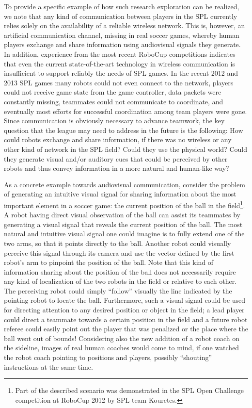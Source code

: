 \documentclass{llncs}
\begin{document}
To provide a specific example of how such research exploration can be realized, we note that 
any kind of communication between players in the SPL currently relies solely on the 
availability of a reliable wireless network. This is, however, an artificial communication 
channel, missing in real soccer games, whereby human players exchange and share information 
using audiovisual signals they generate. 
In addition, experience from the most recent RoboCup competitions indicates that even the 
current state-of-the-art technology in wireless communication is insufficient to support 
reliably the needs of SPL games. In the recent 2012 and 2013 SPL games many robots could not 
even connect to the network, players could not receive game state from the game controller, 
data packets were constantly missing, teammates could not communicate to coordinate, and 
eventually most efforts for successful coordination among team players were gone. Since 
communication is obviously necessary to advance teamwork, the key question that the league 
may need to address in the future is the following: How could robots exchange and share 
information, if there was no wireless or any other kind of network in the SPL field? Could 
they use the physical world? Could they generate visual and/or auditory cues that could be 
perceived by other robots and thus convey information in a more natural and human-like way? 

As a concrete example towards audiovisual communication, consider the problem of generating 
an intuitive visual signal for sharing information about the most important element in a 
soccer game: the current position of the ball in the field\footnote{Part of the described 
scenario was demonstrated in the SPL Open Challenge competition at RoboCup 2012 by SPL team 
Kouretes.}. A robot having direct visual observation of the ball can assist its teammates by 
generating a visual signal that reveals the current position of the ball. The most natural 
and intuitive visual signal one could imagine is to fully extend one of the two arms, so that 
it points directly to the ball. Another robot could visually perceive this signal through its 
camera and use the vector defined by the first robot's arm to pinpoint the position of the 
ball. Note that this kind of information sharing about the position of the ball does not 
necessarily require any kind of localization of the two robots in the field or relative to 
each other. The perceiving robot could simply ``follow'' visually the line indicated by the 
pointing robot to locate the ball. Furthermore, such a visual signal could be used for 
directing attention to any desired position or object in the field; a lead player could 
direct a teammate towards a certain position in the field and a future robot referee could 
easily point out the player that was penalized or the place where the ball went out of 
bounds! Considering also the new addition of a robot coach on the sideline, images of real 
human coaches would come to mind, if one watched the robot coach pointing to positions and 
players, possibly ``shouting'' instructions at the same time. 
\end{document}
